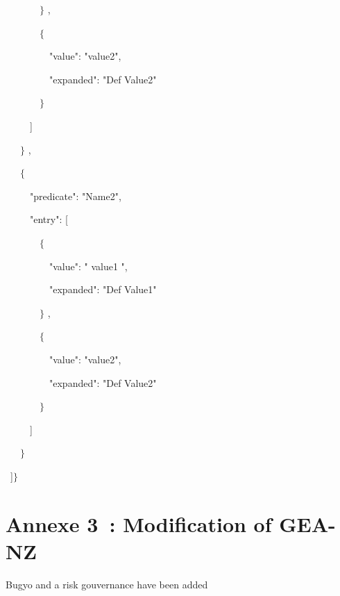 \documentclass[12pt]{report}
\begin{document}
\ \ \ \ \ \ \  $ \} $ ,\par

\ \ \ \ \ \ \  $ \{ $ \par

\ \ \ \ \ \ \ \ \  "value": "value2",\par

\ \ \ \ \ \ \ \ \  "expanded": "Def Value2"\par

\ \ \ \ \ \ \  $ \} $ \par

\ \ \ \ \  ]\par

\ \ \  $ \} $ ,\par

\ \ \  $ \{ $ \par

\ \ \ \ \  "predicate": "Name2",\par

\ \ \ \ \  "entry": [\par

\ \ \ \ \ \ \  $ \{ $ \par

\ \ \ \ \ \ \ \ \  "value": " value1 ",\par

\ \ \ \ \ \ \ \ \  "expanded": "Def Value1"\par

\ \ \ \ \ \ \  $ \} $ ,\par

\ \ \ \ \ \ \  $ \{ $ \par

\ \ \ \ \ \ \ \ \  "value": "value2",\par

\ \ \ \ \ \ \ \ \  "expanded": "Def Value2"\par

\ \ \ \ \ \ \  $ \} $ \par

\ \ \ \ \  ]\par

\ \ \  $ \} $ \par

\  ]$ \} $ \par

\setlength{\parskip}{8.04pt}
\section*{Annexe 3 : Modification of GEA-NZ}
Bugyo and a risk gouvernance have been added\par
\end{document}
